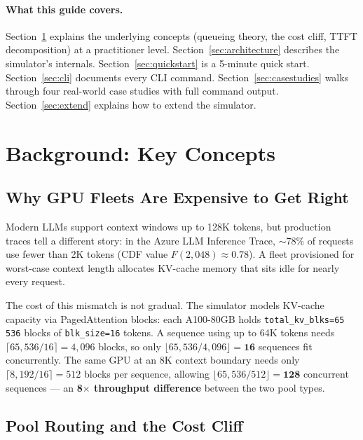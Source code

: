 \documentclass[11pt,a4paper]{article}
\begin{document}
\paragraph{What this guide covers.}
Section~\ref{sec:background} explains the underlying concepts (queueing
theory, the cost cliff, TTFT decomposition) at a practitioner level.
Section~\ref{sec:architecture} describes the simulator's internals.
Section~\ref{sec:quickstart} is a 5-minute quick start.
Section~\ref{sec:cli} documents every CLI command.
Section~\ref{sec:casestudies} walks through four real-world case
studies with full command output.
Section~\ref{sec:extend} explains how to extend the simulator.

\section{Background: Key Concepts}
\label{sec:background}

\subsection{Why GPU Fleets Are Expensive to Get Right}

Modern LLMs support context windows up to 128K tokens, but production
traces tell a different story: in the Azure LLM Inference Trace, $\sim$78\%
of requests use fewer than 2K tokens (CDF value $F(2{,}048) \approx 0.78$).  A fleet provisioned for
worst-case context length allocates KV-cache memory that sits idle
for nearly every request.

The cost of this mismatch is not gradual.  The simulator models KV-cache
capacity via PagedAttention blocks: each A100-80GB holds
\texttt{total\_kv\_blks=65\,536} blocks of \texttt{blk\_size=16} tokens.
A sequence using up to 64K tokens needs $\lceil 65{,}536/16 \rceil = 4{,}096$
blocks, so only $\lfloor 65{,}536 / 4{,}096 \rfloor = \mathbf{16}$ sequences
fit concurrently.  The same GPU at an 8K context boundary needs only
$\lceil 8{,}192/16 \rceil = 512$ blocks per sequence, allowing
$\lfloor 65{,}536 / 512 \rfloor = \mathbf{128}$ concurrent sequences ---
an \textbf{8$\times$ throughput difference} between the two pool types.

\subsection{Pool Routing and the Cost Cliff}
\label{sec:bg-routing}
\end{document}
